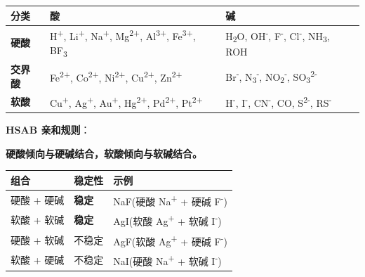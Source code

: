 \documentclass[a4paper,11pt]{ctexart}
\newcounter{none}
\begin{document}
{\def\LTcaptype{none} %
\begin{longtable}[]{@{}
  >{\raggedright\arraybackslash}p{}
  >{\raggedright\arraybackslash}p{}
  >{\raggedright\arraybackslash}p{}@{}}
\toprule\noalign{}
\begin{minipage}[b]{\linewidth}\raggedright
分类
\end{minipage} & \begin{minipage}[b]{\linewidth}\raggedright
酸
\end{minipage} & \begin{minipage}[b]{\linewidth}\raggedright
碱
\end{minipage} \\
\midrule\noalign{}
\endhead
\bottomrule\noalign{}
\endlastfoot
\textbf{硬酸} & H\textsuperscript{+}, Li\textsuperscript{+}, Na\textsuperscript{+}, Mg\textsuperscript{2+}, Al\textsuperscript{3+}, Fe\textsuperscript{3+}, BF\textsubscript{3} & H\textsubscript{2}O, OH\textsuperscript{-}, F\textsuperscript{-}, Cl\textsuperscript{-}, NH\textsubscript{3}, ROH \\
\textbf{交界酸} & Fe\textsuperscript{2+}, Co\textsuperscript{2+}, Ni\textsuperscript{2+}, Cu\textsuperscript{2+}, Zn\textsuperscript{2+} & Br\textsuperscript{-}, N\textsubscript{3}\textsuperscript{-}, NO\textsubscript{2}\textsuperscript{-}, SO\textsubscript{3}\textsuperscript{2-} \\
\textbf{软酸} & Cu\textsuperscript{+}, Ag\textsuperscript{+}, Au\textsuperscript{+}, Hg\textsuperscript{2+}, Pd\textsuperscript{2+}, Pt\textsuperscript{2+} & H\textsuperscript{-}, I\textsuperscript{-}, CN\textsuperscript{-}, CO, S\textsuperscript{2-}, RS\textsuperscript{-} \\
\end{longtable}
}

\textbf{HSAB 亲和规则}：

\textbf{硬酸倾向与硬碱结合，软酸倾向与软碱结合。}

{\def\LTcaptype{none} %
\begin{longtable}[]{@{}lll@{}}
\toprule\noalign{}
组合 & 稳定性 & 示例 \\
\midrule\noalign{}
\endhead
\bottomrule\noalign{}
\endlastfoot
硬酸 + 硬碱 & \textbf{稳定} & NaF(硬酸 Na\textsuperscript{+} + 硬碱 F\textsuperscript{-}) \\
软酸 + 软碱 & \textbf{稳定} & AgI(软酸 Ag\textsuperscript{+} + 软碱 I\textsuperscript{-}) \\
硬酸 + 软碱 & 不稳定 & AgF(软酸 Ag\textsuperscript{+} + 硬碱 F\textsuperscript{-}) \\
软酸 + 硬碱 & 不稳定 & NaI(硬酸 Na\textsuperscript{+} + 软碱 I\textsuperscript{-}) \\
\end{longtable}
}
\end{document}
